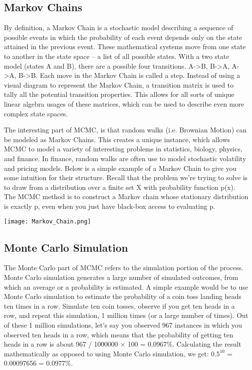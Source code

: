 \documentclass[letterpaper]{article}
\begin{document}
	\subsection{Markov Chains}
	
	By definition, a Markov Chain is a stochastic model describing a sequence of possible events in which the probability of each event depends only on the state attained in the previous event. These mathematical systems move from one state to another in the state space -- a list of all possible states. With a two state model (states A and B), there are a possible four transitions. A->B, B->A, A->A, B->B. Each move in the Markov Chain is called a step. Instead of using a visual diagram to represent the Markov Chain, a transition matrix is used to tally all the potential transition properties. This allows for all sorts of unique linear algebra usages of these matrices, which can be used to describe even more complex state spaces.\cite{grinstead1997}
	
	The interesting part of MCMC, is that random walks (i.e. Brownian Motion) can be modeled as Markov Chains. This creates a unique instance, which allows MCMC to model a variety of interesting problems in statistics, biology, physics, and finance. In finance, random walks are often use to model stochastic volatility and pricing models. Below is a simple example of a Markov Chain to give you some intuition for their structure. Recall that the problem we’re trying to solve is to draw from a distribution over a finite set X with probability function p(x). The MCMC method is to construct a Markov chain whose stationary distribution is exactly p, even when you just have black-box access to evaluating p.
	\begin{center}
		\texttt{[image: Markov\_Chain.png]}
	\end{center}
	\subsection{Monte Carlo Simulation}
	
	The Monte Carlo part of MCMC refers to the simulation portion of the process. Monte Carlo simulation generates a large number of simulated outcomes, from which an average or a probability is estimated. A simple example would be to use Monte Carlo simulation to estimate the probability of a coin toss landing heads ten times in a row. Simulate ten coin tosses, observe if you get ten heads in a row, and repeat this simulation, 1 million times (or a large number of times). Out of these 1 million simulations, let's say you observed 967 instances in which you observed ten heads in a row, which means that the probability of getting ten heads in a row is about 967 / 1000000 $\times$ 100 = 0.0967\%. Calculating the result mathematically as opposed to using Monte Carlo simulation, we get: $0.5^{10}$ = 0.00097656 = 0.0977\%.
	
\end{document}
